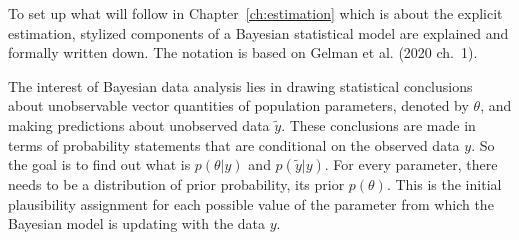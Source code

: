 \documentclass[a4, 12pt]{article}
\begin{document}
To set up what will follow in Chapter~\ref{ch:estimation} which is about the explicit estimation, stylized components of a Bayesian statistical model are explained and formally written down. The notation is based on Gelman et al. (2020 ch.~1).

The interest of Bayesian data analysis lies in drawing statistical conclusions about unobservable vector quantities of population parameters, denoted by \(\theta\), and making predictions about unobserved data \(\tilde{y}\). These conclusions are made in terms of probability statements that are conditional on the observed data \(y\). So the goal is to find out what is \(p(\theta|y)\) and \(p(\tilde y|y)\). For every parameter, there needs to be a distribution of prior probability, its prior \(p(\theta)\). This is the initial plausibility assignment for each possible value of the parameter from which the Bayesian model is updating with the data \(y\).
\end{document}
